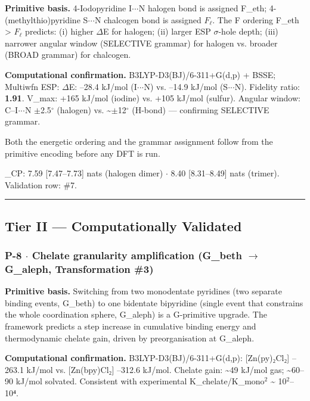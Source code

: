 \documentclass[12pt,a4paper]{article}
\begin{document}
\textbf{Primitive basis.} 4-Iodopyridine I$\cdot$$\cdot$$\cdot$N halogen bond is assigned F\_eth; 4-(methylthio)pyridine S$\cdot$$\cdot$$\cdot$N chalcogen bond is assigned $F_{\ell}$. The F ordering F\_eth \textgreater{} $F_{\ell}$ predicts: (i) higher $\Delta$E for halogen; (ii) larger ESP $\sigma$-hole depth; (iii) narrower angular window (SELECTIVE grammar) for halogen vs. broader (BROAD grammar) for chalcogen.

\textbf{Computational confirmation.} B3LYP-D3(BJ)/6-311+G(d,p) + BSSE; Multiwfn ESP:
$\Delta$E: --28.4 kJ/mol (I$\cdot$$\cdot$$\cdot$N) vs. --14.9 kJ/mol (S$\cdot$$\cdot$$\cdot$N). Fidelity ratio: \textbf{1.91}. V\_max: +165 kJ/mol (iodine) vs. +105 kJ/mol (sulfur). Angular window: C--I$\cdot$$\cdot$$\cdot$N $\pm$2.5$^{\circ}$ (halogen) vs. \textasciitilde{}$\pm$12$^{\circ}$ (H-bond) --- confirming SELECTIVE grammar.

Both the energetic ordering and the grammar assignment follow from the primitive encoding before any DFT is run.

\xi\_CP: 7.59 {[}7.47--7.73{]} nats (halogen dimer) $\cdot$ 8.40 {[}8.31--8.49{]} nats (trimer). Validation row: \#7.

\begin{center}
\rule{0.5\textwidth}{0.4pt}
\end{center}

\subsection{Tier II --- Computationally Validated}

\subsubsection{P-8 $\cdot$ Chelate granularity amplification (G\_beth $\rightarrow$ G\_aleph, Transformation \#3)}

\textbf{Primitive basis.} Switching from two monodentate pyridines (two separate binding events, G\_beth) to one bidentate bipyridine (single event that constrains the whole coordination sphere, G\_aleph) is a G-primitive upgrade. The framework predicts a step increase in cumulative binding energy and thermodynamic chelate gain, driven by preorganisation at G\_aleph.

\textbf{Computational confirmation.} B3LYP-D3(BJ)/6-311+G(d,p): {[}Zn(py)₂Cl₂{]} --263.1 kJ/mol vs. {[}Zn(bpy)Cl₂{]} --312.6 kJ/mol. Chelate gain: \textasciitilde{}49 kJ/mol gas; \textasciitilde{}60--90 kJ/mol solvated. Consistent with experimental K\_chelate/K\_mono$^{2}$ \textasciitilde{} 10$^{2}$--10⁴.
\end{document}
